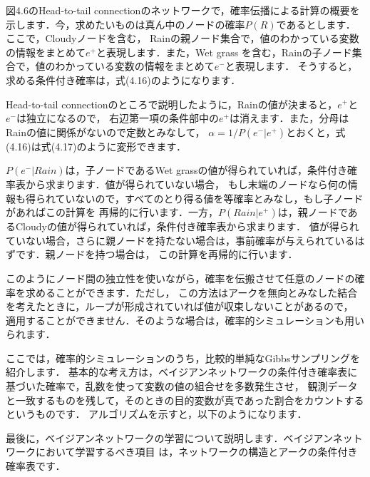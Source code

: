 
図4.6のHead-to-tail connectionのネットワークで，確率伝播による計算の概要を
示します．今，求めたいものは真ん中のノードの確率$P(R)$であるとします．ここで，Cloudyノードを含む，
Rainの親ノード集合で，値のわかっている変数の情報をまとめて$e^+$と表現します．また，Wet grass
を含む，Rainの子ノード集合で，値のわかっている変数の情報をまとめて$e^-$と表現します．
そうすると，求める条件付き確率は，式(4.16)のようになります．


Head-to-tail connectionのところで説明したように，Rainの値が決まると，$e^+$と$e^-$は独立になるので，
右辺第一項の条件部中の$e^+$は消えます．また，分母はRainの値に関係がないので定数とみなして，
$\alpha = 1 / P(e^- \vert e^+)$とおくと，式(4.16)は式(4.17)のように変形できます．


$P(e^- \vert Rain)$は，子ノードであるWet grassの値が得られていれば，条件付き確率表から求まります．値が得られていない場合，
もし末端のノードなら何の情報も得られていないので，すべてのとり得る値を等確率とみなし，もし子ノードがあればこの計算を
再帰的に行います．一方，$P(Rain \vert e^+)$は，親ノードであるCloudyの値が得られていれば，条件付き確率表から求まります．
値が得られていない場合，さらに親ノードを持たない場合は，事前確率が与えられているはずです．親ノードを持つ場合は，
この計算を再帰的に行います．


このようにノード間の独立性を使いながら，確率を伝搬させて任意のノードの確率を求めることができます．ただし，
この方法はアークを無向とみなした結合を考えたときに，ループが形成されていれば値が収束しないことがあるので，
適用することができません．そのような場合は，確率的シミュレーションも用いられます．


ここでは，確率的シミュレーションのうち，比較的単純なGibbsサンプリングを紹介します．
基本的な考え方は，ベイジアンネットワークの条件付き確率表に基づいた確率で，乱数を使って変数の値の組合せを多数発生させ，
観測データと一致するものを残して，そのときの目的変数が真であった割合をカウントするというものです．
アルゴリズムを示すと，以下のようになります．



最後に，ベイジアンネットワークの学習について説明します．ベイジアンネットワークにおいて学習するべき項目
は，ネットワークの構造とアークの条件付き確率表です．

